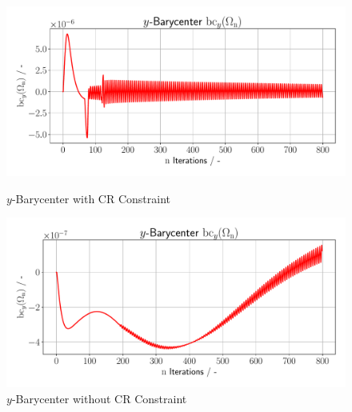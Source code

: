 \begin{figure}[h]
    \begin{minipage}{.5\textwidth}
        \centering
        \includegraphics[width=1\textwidth]{figures/bc_y_plot.pdf}
        \caption{$y$-Barycenter with CR Constraint}
        \label{plot_ref_bc_y_good}
    \end{minipage}
    \begin{minipage}{.5\textwidth}
        \centering
        \includegraphics[width=1\textwidth]{figures/bc_y_plot_bad.pdf}
        \caption{$y$-Barycenter without CR Constraint}
        \label{plot_ref_bc_y_bad}
    \end{minipage}
\end{figure}


